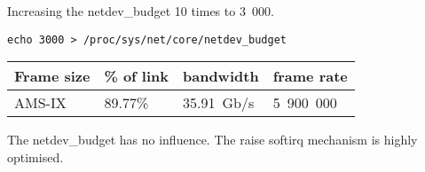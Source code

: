 
Increasing the netdev\_budget 10 times to 3~000.
\begin{lstlisting}
echo 3000 > /proc/sys/net/core/netdev_budget
\end{lstlisting}

\begin{tabular}{ | l | l | l | l | }
\hline
Frame size & \% of link & bandwidth & frame rate \\
\hline
AMS-IX & 89.77\% & 35.91~Gb/s & 5~900~000 \\
\hline
\end{tabular}

The netdev\_budget has no influence.
The raise softirq mechanism is highly optimised.
